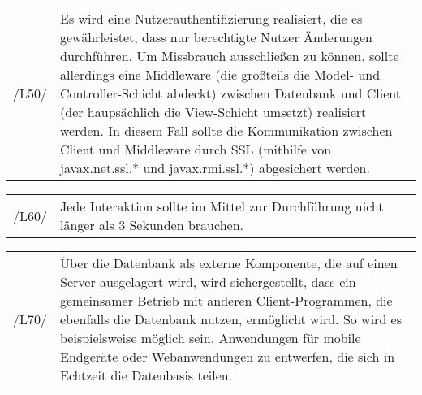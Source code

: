 \begin{tabular}{p{1.5cm}p{14.5cm}}
					
	 /L50/	& Es wird eine Nutzerauthentifizierung realisiert, die es gewährleistet, dass nur berechtigte Nutzer Änderungen durchführen. Um Missbrauch ausschließen zu können, sollte allerdings eine Middleware (die großteils die Model- und Controller-Schicht abdeckt) zwischen Datenbank und Client (der haupsächlich die View-Schicht umsetzt) realisiert werden. In diesem Fall sollte die Kommunikation zwischen Client und Middleware durch SSL (mithilfe von javax.net.ssl.* und javax.rmi.ssl.*) abgesichert werden. \\[0.25cm]
	
\end{tabular}


\begin{tabular}{p{1.5cm}p{14.5cm}}
					
	 /L60/	& Jede Interaktion sollte im Mittel zur Durchführung nicht länger als 3 Sekunden brauchen. \\[0.25cm]
	
\end{tabular}

\begin{tabular}{p{1.5cm}p{14.5cm}}
					
	 /L70/	& Über die Datenbank als externe Komponente, die auf einen Server ausgelagert wird, wird sichergestellt, dass ein gemeinsamer Betrieb mit anderen Client-Programmen, die ebenfalls die Datenbank nutzen, ermöglicht wird. So wird es beispielsweise möglich sein, Anwendungen für mobile Endgeräte oder Webanwendungen zu entwerfen, die sich in Echtzeit die Datenbasis teilen.\\[0.25cm]
	
\end{tabular}



% 

